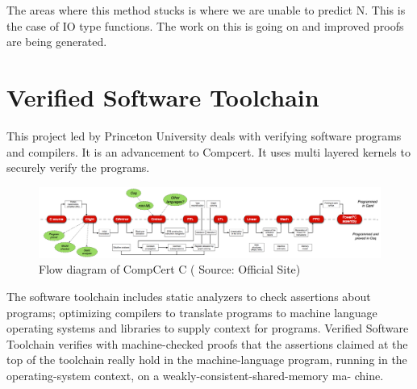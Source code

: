 The areas where this method stucks is where we are unable to predict N. This is the case of IO type functions. The work on this is going on and improved proofs are being generated.\\


\section{Verified Software Toolchain}
This project \cite{VST} led by Princeton University deals with verifying software programs and compilers. It is an advancement to Compcert. It uses multi layered kernels to securely verify the programs.  

\begin{figure}[!htb]
\centering
  \includegraphics[width=\textwidth]{diagram}
  \caption{Flow diagram of CompCert C ( Source: Official Site)}
\end{figure}

The software toolchain includes static analyzers to check assertions about programs; optimizing compilers to translate programs to machine language operating systems and libraries to supply context for programs. Verified Software Toolchain verifies with machine-checked proofs that the assertions claimed at the top of the toolchain really hold in the machine-language program, running in the operating-system context, on a weakly-consistent-shared-memory ma-
chine.


